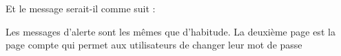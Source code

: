 \documentclass{article}
\begin{document}
\begin{enumerate}
  
  Et le message serait-il comme suit :
 
   
   
   \vspace{0.7cm}
               \hspace*{-0.7in}
               \noindent{}                
               
               
               
               
               
               Les messages d'alerte sont les mêmes que d'habitude. La deuxième page est la page compte qui permet aux utilisateurs de changer leur mot de passe
  
  \vspace{0.7cm}
   
\hspace*{-0.7in}
               \noindent{}  
               

\end{enumerate}
\end{document}
